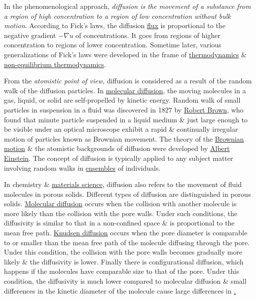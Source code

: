 \documentclass{article}
\begin{document}
In the phenomenological approach, {\it diffusion is the movement of a substance from a region of high concentration to a region of low concentration without bulk motion}. According to Fick's laws, the diffusion \href{https://en.wikipedia.org/wiki/Flux#Flux_as_flow_rate_per_unit_area}{flux} is proportional to the negative gradient $-\nabla u$ of concentrations. It goes from regions of higher concentration to regions of lower concentration. Sometime later, various generalizations of Fick's laws were developed in the frame of \href{https://en.wikipedia.org/wiki/Thermodynamics}{thermodynamics} \& \href{https://en.wikipedia.org/wiki/Non-equilibrium_thermodynamics}{non-equilibrium thermodynamics}.

From the {\it atomistic point of view}, diffusion is considered as a result of the random walk of the diffusion particles. In \href{https://en.wikipedia.org/wiki/Molecular_diffusion}{molecular diffusion}, the moving molecules in a gas, liquid, or solid are self-propelled by kinetic energy. Random walk of small particles in suspension in a fluid was discovered in 1827 by \href{https://en.wikipedia.org/wiki/Robert_Brown_(botanist,_born_1773)}{\sc Robert Brown}, who found that minute particle suspended in a liquid medium \& just large enough to be visible under an optical microscope exhibit a rapid \& continually irregular motion of particles known as Brownian movement. The theory of the \href{https://en.wikipedia.org/wiki/Brownian_motion}{Brownian motion} \& the atomistic backgrounds of diffusion were developed by \href{https://en.wikipedia.org/wiki/Albert_Einstein}{\sc Albert Einstein}. The concept of diffusion is typically applied to any subject matter involving random walks in \href{https://en.wikipedia.org/wiki/Statistical_ensemble_(mathematical_physics)}{ensembles} of individuals.

In chemistry \& \href{https://en.wikipedia.org/wiki/Materials_science}{materials science}, diffusion also refers to the movement of fluid molecules in porous solids. Different types of diffusion are distinguished in porous solids. \href{https://en.wikipedia.org/wiki/Molecular_diffusion}{Molecular diffusion} occurs when the collision with another molecule is more likely than the collision with the pore walls. Under such conditions, the diffusivity is similar to that in a non-confined space \& is proportional to the mean free path. \href{https://en.wikipedia.org/wiki/Knudsen_diffusion}{Knudsen diffusion} occurs when the pore diameter is comparable to or smaller than the mean free path of the molecule diffusing through the pore. Under this condition, the collision with the pore walls becomes gradually more likely \& the diffusivity is lower. Finally there is configurational diffusion, which happens if the molecules have comparable size to that of the pore. Under this condition, the diffusivity is much lower compared to molecular diffusion \& small differences in the kinetic diameter of the molecule cause large differences in \href{mass diffusivity}.
\end{document}
